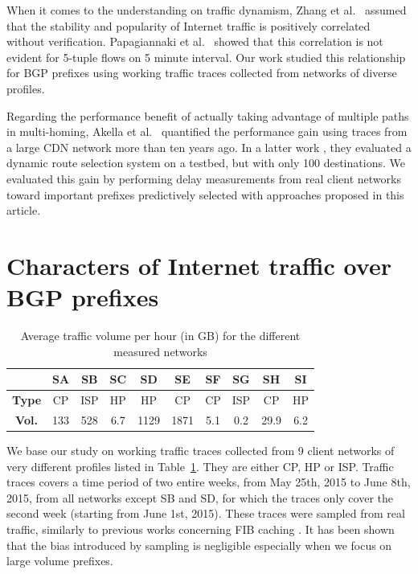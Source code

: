 When it comes to the understanding on traffic dynamism, Zhang et al.\ \cite{Zhang2012} assumed that the stability and popularity of Internet traffic is positively correlated without verification. 
Papagiannaki et al.\ \cite{Papagiannaki2004} showed that this correlation is not evident for 5-tuple flows on 5 minute interval. 
Our work studied this relationship for BGP prefixes using working traffic traces collected from networks of diverse profiles.

Regarding the performance benefit of actually taking advantage of multiple paths in multi-homing, Akella et al.\ \cite{Akella2003a} quantified the performance gain using traces from a large CDN network more than ten years ago. 
In a latter work \cite{Akella2008}, they evaluated a dynamic route selection system on a testbed, but with only 100 destinations. 
We evaluated this gain by performing delay measurements from real client networks toward important prefixes predictively selected with approaches proposed in this article.

\section{Characters of Internet traffic over BGP prefixes}
\label{sec:chp2_chara}
\begin{table}[!tb]
\centering
\setlength{\tabcolsep}{0.5em}
\begin{tabular}{cccccccccc}
\toprule
 & \textbf{SA} & \textbf{SB} & \textbf{SC} & \textbf{SD} & \textbf{SE} & \textbf{SF} & \textbf{SG} & \textbf{SH} & \textbf{SI} \\
\midrule
\textbf{Type} & CP & ISP & HP & HP & CP & CP & ISP & CP & HP \\
\textbf{Vol.} & 133 & 528 & 6.7 & 1129 & 1871 & 5.1 & 0.2 & 29.9 & 6.2 \\
\bottomrule
\end{tabular}
\caption{Average traffic volume per hour (in GB) for the different measured networks}
\label{tab:network_type}
\end{table}

We base our study on working traffic traces collected from 9 client networks of very different profiles listed in Table~\ref{tab:network_type}. 
They are either \ac{CP}, \ac{HP} or \ac{ISP}. 
Traffic traces covers a time period of two entire weeks, from May 25th, 2015 to June 8th, 2015, from all networks except SB and SD, for which the traces only cover the second week (starting from June 1st, 2015).
These traces were sampled from real traffic, similarly to previous works concerning FIB caching \cite{Kim2009, Zhang2012}.
It has been shown that the bias introduced by sampling is negligible especially when we focus on large volume prefixes.

